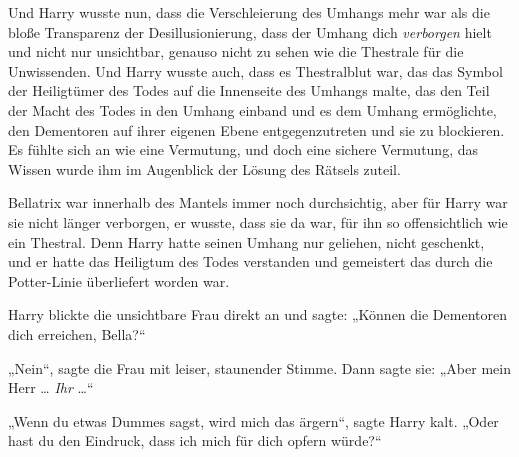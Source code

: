 Und Harry wusste nun, dass die Verschleierung des Umhangs mehr war als die bloße Transparenz der Desillusionierung, dass der Umhang dich \emph{verborgen} hielt und nicht nur unsichtbar, genauso nicht zu sehen wie die Thestrale für die Unwissenden. Und Harry wusste auch, dass es Thestralblut war, das das Symbol der Heiligtümer des Todes auf die Innenseite des Umhangs malte, das den Teil der Macht des Todes in den Umhang einband und es dem Umhang ermöglichte, den Dementoren auf ihrer eigenen Ebene entgegenzutreten und sie zu blockieren. Es fühlte sich an wie eine Vermutung, und doch eine sichere Vermutung, das Wissen wurde ihm im Augenblick der Lösung des Rätsels zuteil.

Bellatrix war innerhalb des Mantels immer noch durchsichtig, aber für Harry war sie nicht länger verborgen, er wusste, dass sie da war, für ihn so offensichtlich wie ein Thestral. Denn Harry hatte seinen Umhang nur geliehen, nicht geschenkt, und er hatte das Heiligtum des Todes verstanden und gemeistert das durch die Potter-Linie überliefert worden war.

Harry blickte die unsichtbare Frau direkt an und sagte:
„Können die Dementoren dich erreichen, Bella?“

„Nein“, sagte die Frau mit leiser, staunender Stimme. Dann sagte sie:
„Aber mein Herr … \emph{Ihr} …“

„Wenn du etwas Dummes sagst, wird mich das ärgern“, sagte Harry kalt.
„Oder hast du den Eindruck, dass ich mich für dich opfern würde?“

